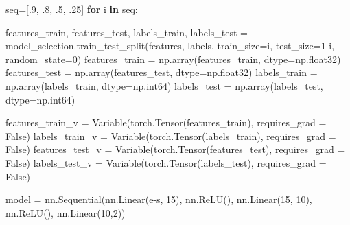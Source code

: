 \documentclass[11pt]{article}
\newenvironment{Shaded}{}{}
\newcommand{\KeywordTok}[1]{\textcolor[rgb]{0.00,0.44,0.13}{\textbf{{#1}}}}
\newcommand{\DecValTok}[1]{\textcolor[rgb]{0.25,0.63,0.44}{{#1}}}
\newcommand{\NormalTok}[1]{{#1}}
\newcommand{\VariableTok}[1]{\textcolor[rgb]{0.10,0.09,0.49}{{#1}}}
\newcommand{\ControlFlowTok}[1]{\textcolor[rgb]{0.00,0.44,0.13}{\textbf{{#1}}}}
\newcommand{\OperatorTok}[1]{\textcolor[rgb]{0.40,0.40,0.40}{{#1}}}
\begin{document}
\begin{Shaded}
\begin{Highlighting}[]
\NormalTok{    seq}\OperatorTok{=}\NormalTok{[.}\DecValTok{9}\NormalTok{, .}\DecValTok{8}\NormalTok{, .}\DecValTok{5}\NormalTok{, .}\DecValTok{25}\NormalTok{]}
    \ControlFlowTok{for}\NormalTok{ i }\KeywordTok{in}\NormalTok{ seq:}

\NormalTok{        features_train, features_test, labels_train, labels_test }\OperatorTok{=}\NormalTok{ model_selection.train_test_split(features, }
\NormalTok{                                                                                                    labels, train_size}\OperatorTok{=}\NormalTok{i,}
\NormalTok{                                                                                                    test_size}\OperatorTok{=}\DecValTok{1}\OperatorTok{-}\NormalTok{i,}
\NormalTok{                                                                                                    random_state}\OperatorTok{=}\DecValTok{0}\NormalTok{)}
\NormalTok{        features_train }\OperatorTok{=}\NormalTok{ np.array(features_train, dtype}\OperatorTok{=}\NormalTok{np.float32)}
\NormalTok{        features_test }\OperatorTok{=}\NormalTok{ np.array(features_test, dtype}\OperatorTok{=}\NormalTok{np.float32)}
\NormalTok{        labels_train }\OperatorTok{=}\NormalTok{ np.array(labels_train, dtype}\OperatorTok{=}\NormalTok{np.int64)}
\NormalTok{        labels_test }\OperatorTok{=}\NormalTok{ np.array(labels_test, dtype}\OperatorTok{=}\NormalTok{np.int64)}
        
\NormalTok{        features_train_v }\OperatorTok{=}\NormalTok{ Variable(torch.Tensor(features_train), requires_grad }\OperatorTok{=} \VariableTok{False}\NormalTok{)}
\NormalTok{        labels_train_v }\OperatorTok{=}\NormalTok{ Variable(torch.Tensor(labels_train), requires_grad }\OperatorTok{=} \VariableTok{False}\NormalTok{)}
\NormalTok{        features_test_v }\OperatorTok{=}\NormalTok{ Variable(torch.Tensor(features_test), requires_grad }\OperatorTok{=} \VariableTok{False}\NormalTok{)}
\NormalTok{        labels_test_v }\OperatorTok{=}\NormalTok{ Variable(torch.Tensor(labels_test), requires_grad }\OperatorTok{=} \VariableTok{False}\NormalTok{)}
         
\NormalTok{        model }\OperatorTok{=}\NormalTok{ nn.Sequential(nn.Linear(e}\OperatorTok{-}\NormalTok{s, }\DecValTok{15}\NormalTok{),    }
\NormalTok{                     nn.ReLU(),}
\NormalTok{                     nn.Linear(}\DecValTok{15}\NormalTok{, }\DecValTok{10}\NormalTok{),}
\NormalTok{                     nn.ReLU(),}
\NormalTok{                     nn.Linear(}\DecValTok{10}\NormalTok{,}\DecValTok{2}\NormalTok{))}
        

\end{Highlighting}
\end{Shaded}
\end{document}
